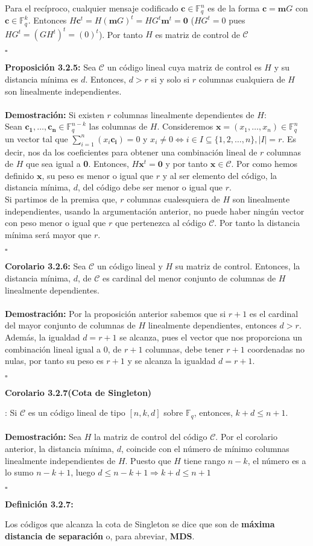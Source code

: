\documentclass[11pt,spanish]{book}
\newcommand{\qed}{\begin{flushright} $\square$ \end{flushright}}
\begin{document}
Para el recíproco, cualquier mensaje codificado $\mathbf{c}\in\mathbb{F}^{n}_{q}$ es de la forma $\mathbf{c}=\mathbf{m}G$ con $\mathbf{c}\in\mathbb{F}_{q}^{k}$. Entonces $H\mathbf{c}^{t}=H(\mathbf{m}G)^{t}=HG^{t}\mathbf{m}^{t} = \mathbf{0}$ ($HG^{t}=0$ pues $HG^{t}=(GH^{t})^{t}=(0)^{t}$). Por tanto $H$ es matriz de control de $\mathcal{C}$
\qed
\textbf{Proposición 3.2.5: }Sea $\mathcal{C}$ un código lineal cuya matriz de control es $H$ y su distancia mínima es $d$. Entonces, $d>r$ si y solo si $r$ columnas cualquiera de $H$ son linealmente independientes.\\
\\ \textbf{Demostración:} Si existen $r$ columnas linealmente dependientes de $H$:\\

Sean $\mathbf{c_{1}},\ldots,\mathbf{c_{n}}\in \mathbb{F}_{q}^{n-k}$ las columnas de $H$. Consideremos $\mathbf{x}=(x_1,\ldots, x_n)\in \mathbb{F}_{q}^{n}$ un vector tal que $\sum_{i=1}^{n}(x_{i}\mathbf{c_{i}})=0$ y $x_{i}\neq 0 \Longleftrightarrow i\in I\subseteq \{1,2,\ldots, n\}, |I|=r$. Es decir, nos da los coeficientes para obtener una combinación lineal de $r$ columnas de $H$ que sea igual a \textbf{0}. Entonces, $H\textbf{x}^{t}=\textbf{0}$ y por tanto $\textbf{x}\in\mathcal{C}$. Por como hemos definido $\textbf{x}$, su peso es menor o igual que $r$ y al ser elemento del código, la distancia mínima, $d$, del código debe ser menor o igual que $r$.\\

Si partimos de la premisa que, $r$ columnas cualesquiera de $H$ son linealmente independientes, usando la argumentación anterior, no puede haber ningún vector con peso menor o igual que $r$ que pertenezca al código $\mathcal{C}$. Por tanto la distancia mínima será mayor que $r$.
\qed
\textbf{Corolario 3.2.6: } Sea $\mathcal{C}$ un código lineal y $H$ su matriz de control. Entonces, la distancia mínima, $d$, de $\mathcal{C}$ es cardinal del menor conjunto de columnas de $H$ linealmente dependientes.\\
\\ \textbf{Demostración:}
Por la proposición anterior sabemos que si $r+1$ es el cardinal del mayor conjunto de columnas de $H$ linealmente dependientes, entonces $d>r$. Además, la igualdad $d=r+1$ se alcanza, pues el vector que nos proporciona un combinación lineal igual a $0$, de $r+1$ columnas, debe tener $r+1$ coordenadas no nulas, por tanto su peso es $r+1$ y se alcanza la igualdad $d=r+1$.
\qed
\hypertarget{sigleton}{\textbf{Corolario 3.2.7(Cota de Singleton)}}: Si $\mathcal{C}$ es un código lineal de tipo $[n,k,d]$ sobre $\mathbb{F}_q$, entonces, $k+d\leq n+1$.\\
\\ \textbf{Demostración: } Sea $H$ la matriz de control del código $\mathcal{C}$. Por el corolario anterior, la distancia mínima, $d$, coincide con el número de mínimo columnas linealmente independientes de $H$. Puesto que $H$ tiene rango $n-k$, el número es a lo sumo $n-k+1$, luego $d\leq n-k+1\Rightarrow k+d\leq n+1$
\qed
\hypertarget{MDS}{\textbf{Definición 3.2.7: }} Los códigos que alcanza la cota de Singleton se dice que son de \textbf{máxima distancia de separación} o, para abreviar, \textbf{MDS}.\\
\end{document}
